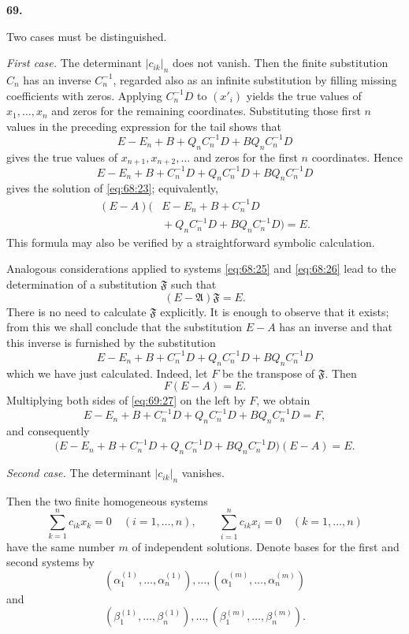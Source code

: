 \documentclass[
  paper=b5,
  fontsize=13pt,
  twoside=true,
  open=any,
  bookmarkpackage=false,
  chapterprefix=true,
  headings=normal
]{scrbook}
\theoremstyle{definition}
\newcommand{\numberedparagraph}[1]{%
  \par\medskip\phantomsection\label{sec:#1}%
  \noindent\textbf{#1.}\enspace
}
\begin{document}
\numberedparagraph{69}
Two cases must be distinguished.

\emph{First case.} The determinant $|c_{ik}|_n$ does not vanish. Then the
finite substitution $C_n$ has an inverse $C_n^{-1}$, regarded also as an
infinite substitution by filling missing coefficients with zeros. Applying
$C_n^{-1}D$ to $(x'_i)$ yields the true values of $x_1,\ldots,x_n$ and
zeros for the remaining coordinates.
Substituting those first $n$ values in the preceding expression for the
tail shows that
\[
 E-E_n+B+Q_nC_n^{-1}D+BQ_nC_n^{-1}D
\]
gives the true values of $x_{n+1},x_{n+2},\ldots$ and zeros for the first
$n$ coordinates. Hence
\[
 E-E_n+B+C_n^{-1}D+Q_nC_n^{-1}D+BQ_nC_n^{-1}D
\]
gives the solution of \eqref{eq:68:23}; equivalently,
\begin{equation}
\begin{split}
 (E-A)\bigl(&E-E_n+B+C_n^{-1}D\\
 &{}+Q_nC_n^{-1}D+BQ_nC_n^{-1}D\bigr)=E.
\end{split}
 \tag{27}\label{eq:69:27}
\end{equation}
This formula may also be verified by a straightforward symbolic calculation.

Analogous considerations applied to systems \eqref{eq:68:25} and
\eqref{eq:68:26} lead to the determination of a substitution \(\mathfrak F\)
such that
\[
  (E-\mathfrak A)\mathfrak F=E.
\]
There is no need to calculate \(\mathfrak F\) explicitly. It is enough to
observe that it exists; from this we shall conclude that the substitution
\(E-A\) has an inverse and that this inverse is furnished by the substitution
\[
  E-E_n+B+C_n^{-1}D+Q_nC_n^{-1}D+BQ_nC_n^{-1}D
\]
which we have just calculated. Indeed, let \(F\) be the transpose of
\(\mathfrak F\). Then
\[
  F(E-A)=E.
\]
Multiplying both sides of \eqref{eq:69:27} on the left by \(F\), we obtain
\[
  E-E_n+B+C_n^{-1}D+Q_nC_n^{-1}D+BQ_nC_n^{-1}D=F,
\]
and consequently
\[
  \bigl(E-E_n+B+C_n^{-1}D+Q_nC_n^{-1}D
    +BQ_nC_n^{-1}D\bigr)(E-A)=E.
\]

\emph{Second case.} The determinant $|c_{ik}|_n$ vanishes.

Then the two finite homogeneous systems
\begin{equation}
 \sum_{k=1}^{n}c_{ik}x_k=0\quad(i=1,\ldots,n),
 \qquad
 \sum_{i=1}^{n}c_{ik}x_i=0\quad(k=1,\ldots,n)
 \tag{28}\label{eq:69:28}
\end{equation}
have the same number $m$ of independent solutions. Denote bases for the
first and second systems by
\[
 (\alpha_1^{(1)},\ldots,\alpha_n^{(1)}),\ldots,
 (\alpha_1^{(m)},\ldots,\alpha_n^{(m)})
\]
and
\[
 (\beta_1^{(1)},\ldots,\beta_n^{(1)}),\ldots,
 (\beta_1^{(m)},\ldots,\beta_n^{(m)}).
\]
\end{document}
